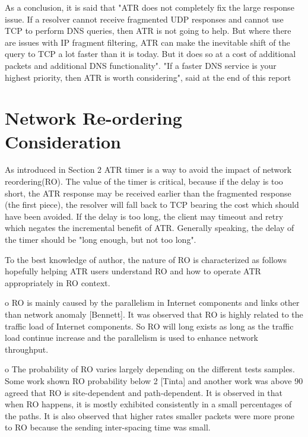    As a conclusion, it is said that "ATR does not completely fix the
   large response issue.  If a resolver cannot receive fragmented UDP
   responses and cannot use TCP to perform DNS queries, then ATR is not
   going to help.  But where there are issues with IP fragment
   filtering, ATR can make the inevitable shift of the query to TCP a
   lot faster than it is today.  But it does so at a cost of additional
   packets and additional DNS functionality".  "If a faster DNS service
   is your highest priority, then ATR is worth considering", said at the
   end of this report


\section{Network Re-ordering Consideration}


As introduced in Section 2 ATR timer is a way to avoid the impact of
network reordering(RO).  The value of the timer is critical, because
if the delay is too short, the ATR response may be received earlier
than the fragmented response (the first piece), the resolver will
fall back to TCP bearing the cost which should have been avoided.  If
the delay is too long, the client may timeout and retry which negates
the incremental benefit of ATR.  Generally speaking, the delay of the
timer should be "long enough, but not too long".

To the best knowledge of author, the nature of RO is characterized as
follows hopefully helping ATR users understand RO and how to operate
ATR appropriately in RO context.

o  RO is mainly caused by the parallelism in Internet components and
   links other than network anomaly [Bennett].  It was observed that
   RO is highly related to the traffic load of Internet components.
   So RO will long exists as long as the traffic load continue
   increase and the parallelism is used to enhance network
   throughput.

o  The probability of RO varies largely depending on the different
   tests samples.  Some work shown RO probability below 2%
   [Tinta] and another work was above 90%
   agreed that RO is site-dependent and path-dependent.  It is
   observed in that when RO happens, it is mostly exhibited
   consistently in a small percentages of the paths.  It is also
   observed that higher rates smaller packets were more prone to RO
   because the sending inter-spacing time was small.

